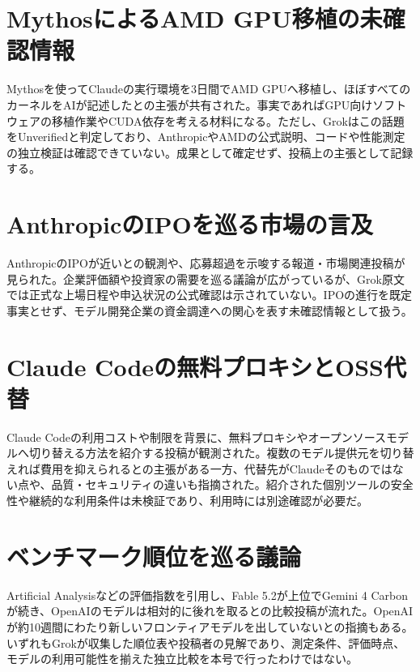 \section{MythosによるAMD GPU移植の未確認情報}
Mythosを使ってClaudeの実行環境を3日間でAMD GPUへ移植し、ほぼすべてのカーネルをAIが記述したとの主張が共有された。事実であればGPU向けソフトウェアの移植作業やCUDA依存を考える材料になる。ただし、Grokはこの話題をUnverifiedと判定しており、AnthropicやAMDの公式説明、コードや性能測定の独立検証は確認できていない。成果として確定せず、投稿上の主張として記録する。

\section{AnthropicのIPOを巡る市場の言及}
AnthropicのIPOが近いとの観測や、応募超過を示唆する報道・市場関連投稿が見られた。企業評価額や投資家の需要を巡る議論が広がっているが、Grok原文では正式な上場日程や申込状況の公式確認は示されていない。IPOの進行を既定事実とせず、モデル開発企業の資金調達への関心を表す未確認情報として扱う。

\section{Claude Codeの無料プロキシとOSS代替}
Claude Codeの利用コストや制限を背景に、無料プロキシやオープンソースモデルへ切り替える方法を紹介する投稿が観測された。複数のモデル提供元を切り替えれば費用を抑えられるとの主張がある一方、代替先がClaudeそのものではない点や、品質・セキュリティの違いも指摘された。紹介された個別ツールの安全性や継続的な利用条件は未検証であり、利用時には別途確認が必要だ。

\section{ベンチマーク順位を巡る議論}
Artificial Analysisなどの評価指数を引用し、Fable 5.2が上位でGemini 4 Carbonが続き、OpenAIのモデルは相対的に後れを取るとの比較投稿が流れた。OpenAIが約10週間にわたり新しいフロンティアモデルを出していないとの指摘もある。いずれもGrokが収集した順位表や投稿者の見解であり、測定条件、評価時点、モデルの利用可能性を揃えた独立比較を本号で行ったわけではない。